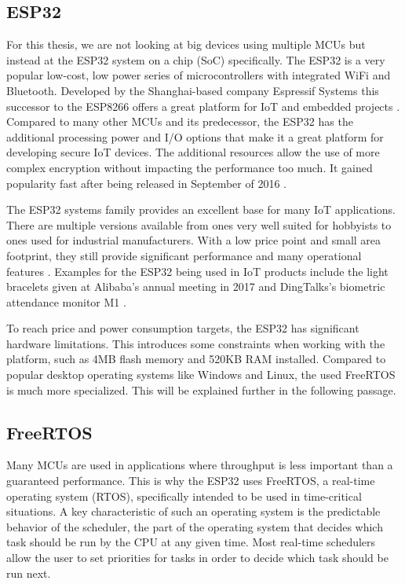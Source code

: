 \subsection{ESP32}
For this thesis, we are not looking at big devices using multiple MCUs but instead at the ESP32 system on a chip (SoC) specifically. The ESP32 is a very popular low-cost, low power series of microcontrollers with integrated WiFi and Bluetooth. Developed by the Shanghai-based company Espressif Systems this successor to the ESP8266 offers a great platform for IoT and embedded projects \autocite{noauthor_esp32_nodate}. Compared to many other MCUs and its predecessor, the ESP32 has the additional processing power and I/O options that make it a great platform for developing secure IoT devices. The additional resources allow the use of more complex encryption without impacting the performance too much. It gained popularity fast after being released in September of 2016 \autocite{espressif_systems_espressif_2016}.

The ESP32 systems family provides an excellent base for many IoT applications. There are multiple versions available from ones very well suited for hobbyists to ones used for industrial manufacturers. With a low price point and small area footprint, they still provide significant performance and many operational features \autocite{maier_comparative_2017}. Examples for the ESP32 being used in IoT products include the light bracelets given at Alibaba's annual meeting in 2017 \autocite{noauthor_alibabas_2017} and DingTalks's biometric attendance monitor M1 \autocite{noauthor_dingtalks_2017}.

To reach price and power consumption targets, the ESP32 has significant hardware limitations. This introduces some constraints when working with the platform, such as 4MB flash memory and 520KB RAM installed. Compared to popular desktop operating systems like Windows and Linux, the used FreeRTOS is much more specialized. This will be explained further in the following passage.

\subsection{FreeRTOS}\label{subsec:freertos}

Many MCUs are used in applications where throughput is less important than a guaranteed performance. This is why the ESP32 uses FreeRTOS, a real-time operating system (RTOS), specifically intended to be used in time-critical situations. A key characteristic of such an operating system is the predictable behavior of the scheduler, the part of the operating system that decides which task should be run by the CPU at any given time. Most real-time schedulers allow the user to set priorities for tasks in order to decide which task should be run next.

